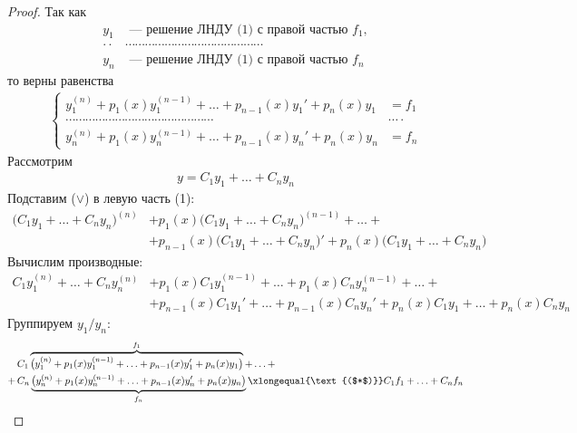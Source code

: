 \begin{proof}
    Так как \vspace{-\topsep}
    \begin{align*}
        y_1 &\text{ --- решение ЛНДУ (1) с правой частью } f_1, \\ 
        \cdot\cdot&\cdots\cdots\cdots\cdots\cdots\cdots\cdots\cdots\cdots\cdots\cdots\cdots\cdots\cdots \\
        y_n &\text{ --- решение ЛНДУ (1) с правой частью } f_n
    \end{align*}
    то верны равенства
    \begin{align*}
        \left\{\begin{aligned}
            y_1^{(n)} + p_1(x)y_1^{(n-1)} + \ldots + p_{n-1}(x)y_1' + p_n(x)y_1 &= f_1 \\ 
            \cdots\cdots\cdots\cdots\cdots\cdots\cdots\cdots\cdots\cdots\cdots\cdots\cdots\cdots\cdots&\cdots\cdot \\
            y_n^{(n)} + p_1(x)y_n^{(n-1)} + \ldots + p_{n-1}(x)y_n' + p_n(x)y_n &= f_n
        \end{aligned}\right. \tag{$*$}
    \end{align*}
    Рассмотрим \vspace{-\topsep}
    \begin{align*}
        y = C_1 y_1 + \ldots + C_ny_n \tag{$\vee$}
    \end{align*}
    Подставим ($\vee$) в левую часть (1):
    \begin{align*}
        \big(C_1 y_1 + \ldots + C_ny_n\big)^{(n)} &+ p_1(x)\big(C_1 y_1 + \ldots + C_ny_n\big)^{(n-1)} + \ldots + \\ 
        &+ p_{n-1} (x) \big(C_1 y_1 + \ldots + C_ny_n\big)' + p_n(x) \big(C_1 y_1 + \ldots + C_ny_n\big)
    \end{align*}
    Вычислим производные:
    \begin{align*}
        C_1 y_1^{(n)} + \ldots + C_ny_n^{(n)} &+ p_1(x)C_1 y_1^{(n-1)} + \ldots + p_1(x)C_ny_n^{(n-1)} + \ldots + \\ 
        &+ p_{n-1} (x) C_1 y_1' + \ldots + p_{n-1}(x)C_ny_n' + p_n(x) C_1 y_1 + \ldots + p_n(x)C_ny_n
    \end{align*}
    Группируем $y_1/y_n$:
    \begin{align*}
        &C_1 \overbrace{\big(y_1^{(n)} + p_1(x)y_1^{(n-1)} + \ldots + p_{n-1} (x) y_1' + p_n(x) y_1\big)}^{f_1} + \ldots + \\ 
        +\, &C_n \underbrace{\big(y_n^{(n)} + p_1(x)y_n^{(n-1)} + \ldots + p_{n-1}(x) y_n'+ p_n(x) y_n\big)}_{f_n} \xlongequal{\text{($*$)}} C_1f_1 + \ldots + C_nf_n
    \end{align*}
\end{proof}


